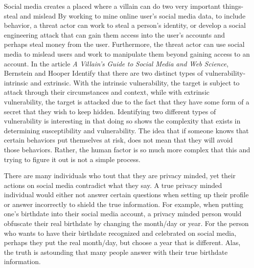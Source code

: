 \documentclass[conference]{IEEEtran}
\begin{document}
Social media creates a placed where a villain can do two very important things- steal and mislead\cite{Bernstein:2018:VGS:3209542.3210576} By working to mine online user's social media data, to include behavior, a threat actor can work to steal a person's identity, or develop a social engineering attack that can gain them access into the user's accounts and perhaps steal money from the user.  Furthermore, the threat actor can use social media to mislead users and work to manipulate them beyond gaining access to an account. In the article \textit{ A Villain’s Guide to Social Media and Web Science}, Bernstein and Hooper Identify that there are two distinct types of vulnerability- intrinsic and extrinsic. With the intrinsic vulnerability, the target is subject to attack through their circumstances and context, while with extrinsic vulnerability, the target is attacked due to the fact that they have some form of a secret that they wish to keep hidden\cite{Bernstein:2018:VGS:3209542.3210576}.  Identifying two different types of vulnerability is interesting in that doing so shows the complexity that exists in determining susceptibility and vulnerability.  The idea that if someone knows that certain behaviors put themselves at risk, does not mean that they will avoid those behaviors.  Rather, the human factor is so much more complex that this and trying to figure it out is not a simple process. 

There are many individuals who tout that they are privacy minded, yet their actions on social media contradict what they say.  A true privacy minded individual would either not answer certain questions when setting up their profile or answer incorrectly to shield the true information.  For example, when putting one’s birthdate into their social media account, a privacy minded person would obfuscate their real birthdate by changing the month/day or year.  For the person who wants to have their birthdate recognized and celebrated on social media, perhaps they put the real month/day, but choose a year that is different. Alas, the truth is astounding that many people answer with their true birthdate information.  
\end{document}
